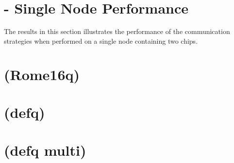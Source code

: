 \section{ - Single Node Performance}
The results in this section illustrates the performance of the communication strategies when performed on a single node containing two \phantom{a}chips.  

\medskip


\section{(Rome16q) \romeq}


\section{(defq) }
\section{(defq multi) }






